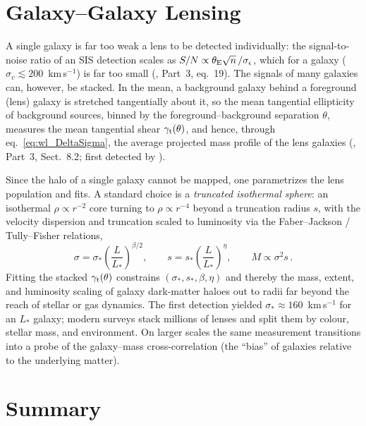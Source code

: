 \section{Galaxy--Galaxy Lensing}
\label{sec:wl_ggl}

A single galaxy is far too weak a lens to be detected individually: the
signal-to-noise ratio of an SIS detection scales as $S/N \propto
\theta_{\mathrm{E}}\sqrt{n}\,/\sigma_\epsilon$, which for a galaxy
($\sigma_v \lesssim 200$~km\,s$^{-1}$) is far too small
(\citealp{schneider_kochanek_wambsganss_2006}, Part~3, eq.~19).  The
signals of many galaxies can, however, be stacked.  In the mean, a
background galaxy behind a foreground (lens) galaxy is stretched
tangentially about it, so the mean tangential ellipticity of background
sources, binned by the foreground--background separation $\theta$,
measures the mean tangential shear $\gamma_{\mathrm t}(\theta)$,
and hence, through eq.~\eqref{eq:wl_DeltaSigma}, the average
projected mass profile of the lens galaxies
(\citealp{schneider_kochanek_wambsganss_2006}, Part~3, Sect.~8.2;
first detected by \citet{brainerd_1996}).

Since the halo of a single galaxy cannot be mapped, one parametrizes the
lens population and fits.  A standard choice is a \emph{truncated
isothermal sphere}: an isothermal $\rho \propto r^{-2}$ core turning to
$\rho \propto r^{-4}$ beyond a truncation radius $s$, with the velocity
dispersion and truncation scaled to luminosity via the
Faber--Jackson / Tully--Fisher relations,
\begin{equation}
    \sigma = \sigma_* \left(\frac{L}{L_*}\right)^{\beta/2},
    \qquad
    s = s_* \left(\frac{L}{L_*}\right)^{\eta},
    \qquad
    M \propto \sigma^2 s\,.
    \label{eq:wl_ggl_scaling}
\end{equation}
Fitting the stacked $\gamma_{\mathrm t}(\theta)$ constrains
$(\sigma_*, s_*, \beta, \eta)$ and thereby the mass, extent, and
luminosity scaling of galaxy dark-matter haloes out to radii far beyond
the reach of stellar or gas dynamics.  The first detection
\citep{brainerd_1996} yielded $\sigma_* \approx 160$~km\,s$^{-1}$ for an
$L_*$ galaxy; modern surveys stack millions of lenses and split them by
colour, stellar mass, and environment.  On larger scales the same
measurement transitions into a probe of the galaxy--mass cross-correlation
(the ``bias'' of galaxies relative to the underlying matter).


\section{Summary}
\label{sec:wl_summary}

